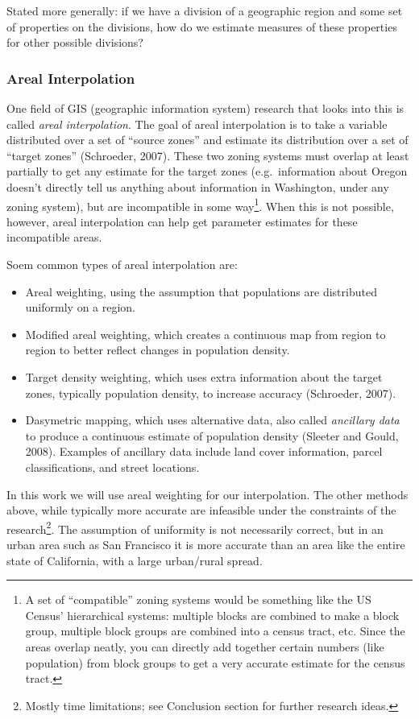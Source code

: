 \documentclass[12pt,twoside]{reedthesis}
\theoremstyle{definition}
\theoremstyle{definition}
\theoremstyle{definition}
\theoremstyle{remark}
\begin{document}
Stated more generally: if we have a division of a geographic region and
some set of properties on the divisions, how do we estimate measures of
these properties for other possible divisions?

\hypertarget{areal-interpolation}{%
\subsubsection{Areal Interpolation}\label{areal-interpolation}}

One field of GIS (geographic information system) research that looks
into this is called \emph{areal interpolation}. The goal of areal
interpolation is to take a variable distributed over a set of ``source
zones'' and estimate its distribution over a set of ``target zones''
(Schroeder, 2007). These two zoning systems must overlap at least
partially to get any estimate for the target zones (e.g.~information
about Oregon doesn't directly tell us anything about information in
Washington, under any zoning system), but are incompatible in some
way\footnote{A set of ``compatible'' zoning systems would be something
  like the US Census' hierarchical systems: multiple blocks are combined
  to make a block group, multiple block groups are combined into a
  census tract, etc. Since the areas overlap neatly, you can directly
  add together certain numbers (like population) from block groups to
  get a very accurate estimate for the census tract.}. When this is not
possible, however, areal interpolation can help get parameter estimates
for these incompatible areas.

Soem common types of areal interpolation are:
\begin{itemize}
\item
  Areal weighting, using the assumption that populations are distributed
  uniformly on a region.
\item
  Modified areal weighting, which creates a continuous map from region
  to region to better reflect changes in population density.
\item
  Target density weighting, which uses extra information about the
  target zones, typically population density, to increase accuracy
  (Schroeder, 2007).
\item
  Dasymetric mapping, which uses alternative data, also called
  \emph{ancillary data} to produce a continuous estimate of population
  density (Sleeter and Gould, 2008). Examples of ancillary data include
  land cover information, parcel classifications, and street locations.
\end{itemize}
In this work we will use areal weighting for our interpolation. The
other methods above, while typically more accurate are infeasible under
the constraints of the research\footnote{Mostly time limitations; see
  Conclusion section for further research ideas.}. The assumption of
uniformity is not necessarily correct, but in an urban area such as San
Francisco it is more accurate than an area like the entire state of
California, with a large urban/rural spread.
\end{document}
